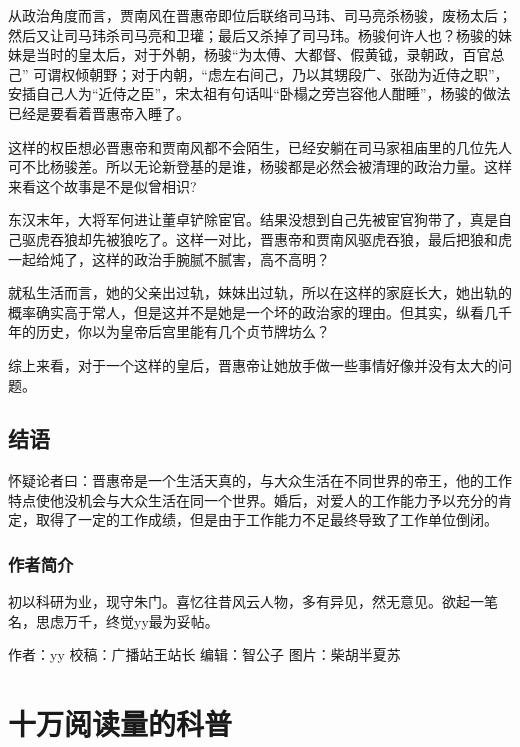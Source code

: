 \documentclass[]{book}
\begin{document}
从政治角度而言，贾南风在晋惠帝即位后联络司马玮、司马亮杀杨骏，废杨太后；然后又让司马玮杀司马亮和卫瓘；最后又杀掉了司马玮。杨骏何许人也？杨骏的妹妹是当时的皇太后，对于外朝，杨骏``为太傅、大都督、假黄钺，录朝政，百官总己''
可谓权倾朝野；对于内朝，``虑左右间己，乃以其甥段广、张劭为近侍之职''，安插自己人为``近侍之臣''，宋太祖有句话叫``卧榻之旁岂容他人酣睡''，杨骏的做法已经是要看着晋惠帝入睡了。

这样的权臣想必晋惠帝和贾南风都不会陌生，已经安躺在司马家祖庙里的几位先人可不比杨骏差。所以无论新登基的是谁，杨骏都是必然会被清理的政治力量。这样来看这个故事是不是似曾相识?

东汉末年，大将军何进让董卓铲除宦官。结果没想到自己先被宦官狗带了，真是自己驱虎吞狼却先被狼吃了。这样一对比，晋惠帝和贾南风驱虎吞狼，最后把狼和虎一起给炖了，这样的政治手腕腻不腻害，高不高明？

就私生活而言，她的父亲出过轨，妹妹出过轨，所以在这样的家庭长大，她出轨的概率确实高于常人，但是这并不是她是一个坏的政治家的理由。但其实，纵看几千年的历史，你以为皇帝后宫里能有几个贞节牌坊么？

综上来看，对于一个这样的皇后，晋惠帝让她放手做一些事情好像并没有太大的问题。

\subsection{结语}\label{-5}

怀疑论者曰：晋惠帝是一个生活天真的，与大众生活在不同世界的帝王，他的工作特点使他没机会与大众生活在同一个世界。婚后，对爱人的工作能力予以充分的肯定，取得了一定的工作成绩，但是由于工作能力不足最终导致了工作单位倒闭。

\subsubsection*{作者简介}

初以科研为业，现守朱门。喜忆往昔风云人物，多有异见，然无意见。欲起一笔名，思虑万千，终觉yy最为妥帖。

作者：yy 校稿：广播站王站长 编辑：智公子 图片：柴胡半夏苏

\section{十万阅读量的科普}
\end{document}
